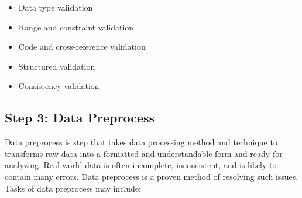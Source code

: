 \documentclass[
]{book}
\providecommand{\tightlist}{%
  \setlength{\itemsep}{0pt}\setlength{\parskip}{0pt}}
\begin{document}
\begin{itemize}
\tightlist
\item
  Data type validation
\item
  Range and constraint validation
\item
  Code and cross-reference validation
\item
  Structured validation
\item
  Consistency validation
\end{itemize}

\hypertarget{preprocess}{%
\subsection*{Step 3: Data Preprocess}\label{preprocess}}


Data preprocess is step that takes data processing method and technique to transforms raw data into a formatted and understandable form and ready for analyzing. Real world data is often incomplete, inconsistent, and is likely to contain many errors. Data preprocess is a proven method of resolving such issues. Tasks of data preprocess may include:
\end{document}
